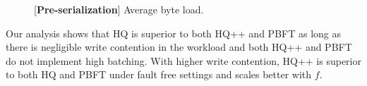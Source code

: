 \documentclass[twocolumn,10pt]{article}
\begin{document}
\begin{figure}[t]
\centering
\begin{minipage}[t]{0.47\textwidth}
\caption{\label{fig:abs_mesg_count_comp} [\textbf{Pre-serialization}] Average message load.
$C$ represents contention in the workload.}
\end{minipage}
\begin{minipage}[t]{0.47\textwidth}
\caption{\label{fig:byte_count_comp} [\textbf{Pre-serialization}] Average byte load.}
\end{minipage}
\end{figure}

 Our analysis shows that HQ is superior to both HQ++ and PBFT as long as there is
negligible write contention in the workload and both HQ++ and PBFT do not implement high
batching. With higher write contention, HQ++ is superior to both HQ and PBFT under fault free
settings and scales better with $f$.
\end{document}
